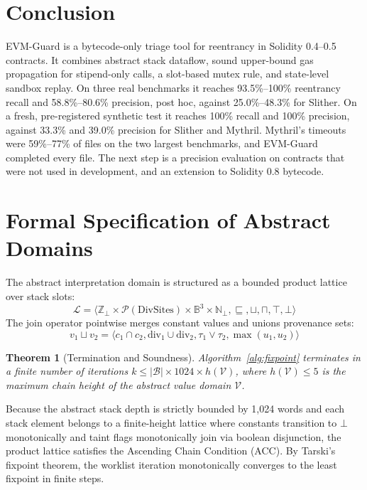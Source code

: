 \documentclass[conference]{IEEEtran}
\newtheorem{thm}{Theorem}
\newenvironment{theorem}[1][]{\begin{thm}[#1]\upshape}{\end{thm}}
\begin{document}
\section{Conclusion}\label{sec:conclusion}

EVM-Guard is a bytecode-only triage tool for reentrancy in Solidity 0.4--0.5 contracts. It combines abstract stack dataflow, sound upper-bound gas propagation for stipend-only calls, a slot-based mutex rule, and state-level sandbox replay. On three real benchmarks it reaches 93.5\%--100\% reentrancy recall and 58.8\%--80.6\% precision, post hoc, against 25.0\%--48.3\% for Slither. On a fresh, pre-registered synthetic test it reaches 100\% recall and 100\% precision, against 33.3\% and 39.0\% precision for Slither and Mythril. Mythril's timeouts were 59\%--77\% of files on the two largest benchmarks, and EVM-Guard completed every file. The next step is a precision evaluation on contracts that were not used in development, and an extension to Solidity 0.8 bytecode.

\balance



\clearpage
\appendices

\section{Formal Specification of Abstract Domains}\label{app:domains}
The abstract interpretation domain is structured as a bounded product lattice over stack slots:
\begin{equation}
\mathcal{L} = \langle \mathbb{Z}_{\bot} \times \mathcal{P}(\mathrm{DivSites}) \times \mathbb{B}^3 \times \mathbb{N}_{\bot}, \sqsubseteq, \sqcup, \sqcap, \top, \bot \rangle
\end{equation}
The join operator pointwise merges constant values and unions provenance sets:
\begin{equation}
v_1 \sqcup v_2 = \langle c_1 \cap c_2, \mathrm{div}_1 \cup \mathrm{div}_2, \tau_1 \lor \tau_2, \max(u_1, u_2) \rangle
\end{equation}

\begin{theorem}[Termination and Soundness]
Algorithm~\ref{alg:fixpoint} terminates in a finite number of iterations $k \le |\mathcal{B}| \times 1024 \times h(\mathcal{V})$, where $h(\mathcal{V}) \le 5$ is the maximum chain height of the abstract value domain $\mathcal{V}$.
\end{theorem}
\begin{IEEEproof}
Because the abstract stack depth is strictly bounded by 1,024 words and each stack element belongs to a finite-height lattice where constants transition to $\bot$ monotonically and taint flags monotonically join via boolean disjunction, the product lattice satisfies the Ascending Chain Condition (ACC). By Tarski's fixpoint theorem, the worklist iteration monotonically converges to the least fixpoint in finite steps.
\end{IEEEproof}
\end{document}

